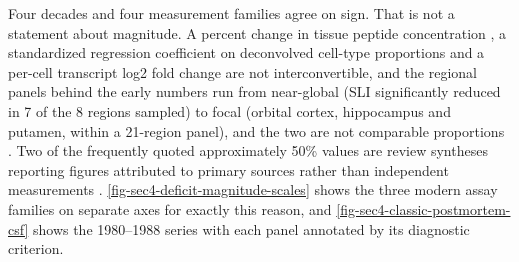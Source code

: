 \documentclass[11pt]{article}
\begin{document}
Four decades and four measurement families agree on sign. That is not a statement about magnitude. A percent change in tissue peptide concentration \citep{Mazurek1991,Rossor1980}, a standardized regression coefficient on deconvolved cell-type proportions \citep{Consens2022b} and a per-cell transcript log2 fold change \citep{Castanho2025b} are not interconvertible, and the regional panels behind the early numbers run from near-global (SLI significantly reduced in 7 of the 8 regions sampled) to focal (orbital cortex, hippocampus and putamen, within a 21-region panel), and the two are not comparable proportions \citep{Davies1981,Arai1984}. Two of the frequently quoted approximately 50\% values are review syntheses reporting figures attributed to primary sources rather than independent measurements \citep{Sandoval2024,Solarski2018}. \ref{fig-sec4-deficit-magnitude-scales} shows the three modern assay families on separate axes for exactly this reason, and \ref{fig-sec4-classic-postmortem-csf} shows the 1980--1988 series with each panel annotated by its diagnostic criterion.
\end{document}
